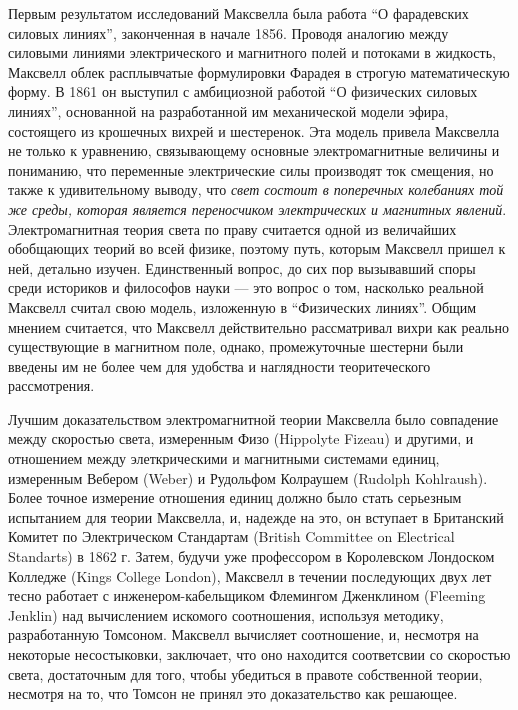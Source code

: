 \documentclass[12pt, oneside, a4paper]{article}
\begin{document}
Первым результатом исследований Максвелла была работа ``О фарадевских силовых линиях'', законченная в начале 1856. Проводя аналогию между силовыми линиями электрического и магнитного полей и потоками в жидкость, Максвелл облек расплывчатые формулировки Фарадея в строгую математическую форму. В 1861 он выступил с амбициозной работой ``О физических силовых линиях'', основанной на разработанной им механической модели эфира, состоящего из крошечных вихрей и шестеренок. Эта модель привела Максвелла не только к уравнению, связывающему основные электромагнитные величины и пониманию, что переменные электрические силы производят ток смещения, но также к удивительному выводу, что \emph{свет состоит в поперечных колебаниях той же среды, которая является переносчиком электрических и магнитных явлений}. 
Электромагнитная теория света по праву считается одной из величайших обобщающих теорий во всей физике, поэтому путь, которым Максвелл пришел к ней, детально изучен. Единственный вопрос, до сих пор вызывавший споры среди историков и философов науки --- это вопрос о том, насколько реальной Максвелл считал свою модель, изложенную в ``Физических линиях''. Общим мнением считается, что Максвелл действительно рассматривал вихри как реально существующие в магнитном поле, однако, промежуточные шестерни были введены им не более чем для удобства и наглядности теоритеческого рассмотрения. 

Лучшим доказательством электромагнитной теории Максвелла было совпадение между скоростью света, измеренным Физо (Hippolyte Fizeau) и другими, и отношением между элеткрическими и магнитными системами единиц, измеренным Вебером (Weber) и Рудольфом Колраушем (Rudolph Kohlraush). Более точное измерение отношения единиц должно было стать серьезным испытанием для теории Максвелла, и, надежде на это, он вступает в Британский Комитет по Электрическом Стандартам (British Committee on Electrical Standarts) в 1862 г. Затем, будучи уже профессором в Королевском Лондоском Колледже (Kings College London), Максвелл в течении последующих двух лет тесно работает с инженером-кабельщиком Флемингом Дженклином (Fleeming Jenklin) над вычислением искомого соотношения, используя методику, разработанную Томсоном. Максвелл вычисляет соотношение, и, несмотря на некоторые несостыковки, заключает, что оно находится соответсвии со скоростью света, достаточным для того, чтобы убедиться в правоте собственной теории, несмотря на то, что Томсон не принял это доказательство как решающее. 
\end{document}
